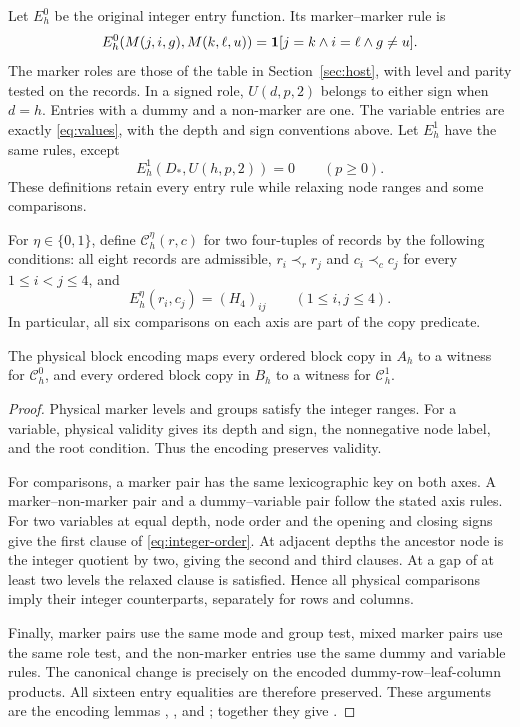 Let $E_h^0$ be the original integer entry function. Its marker--marker
rule is
\[
 E_h^0(M(j,i,g),M(k,\ell,u))=\mathbf1[j=k\land i=\ell\land g\ne u].
\]
The marker roles are those of the table in Section~\ref{sec:host}, with
level and parity tested on the records. In a signed role, $U(d,p,2)$
belongs to either sign when $d=h$. Entries with a dummy and a non-marker
are one. The variable entries are exactly \eqref{eq:values}, with the
depth and sign conventions above. Let $E_h^1$ have the same rules, except
\[
 E_h^1(D_*,U(h,p,2))=0\qquad(p\ge0).
\]
These definitions retain every entry rule while relaxing node ranges and
some comparisons.

For $\eta\in\{0,1\}$, define $\mathcal C_h^\eta(r,c)$ for two
four-tuples of records by the following conditions: all eight records are
admissible, $r_i\prec_r r_j$ and $c_i\prec_c c_j$ for every
$1\le i<j\le4$, and
\[
 E_h^\eta(r_i,c_j)=(H_4)_{ij}\qquad(1\le i,j\le4).
\]
In particular, all six comparisons on each axis are part of the copy
predicate.

\begin{lemma}\label{lem:encoding}
The physical block encoding maps every ordered block copy in $A_h$ to
a witness for $\mathcal C_h^0$, and every ordered block copy in $B_h$ to
a witness for $\mathcal C_h^1$.
\end{lemma}
\begin{proof}
Physical marker levels and groups satisfy the integer ranges. For a
variable, physical validity gives its depth and sign, the nonnegative
node label, and the root condition. Thus the encoding preserves validity.

For comparisons, a marker pair has the same lexicographic key on both
axes. A marker--non-marker pair and a dummy--variable pair follow the
stated axis rules. For two variables at equal depth, node order and the
opening and closing signs give the first clause of
\eqref{eq:integer-order}. At adjacent depths the ancestor node is the
integer quotient by two, giving the second and third clauses. At a gap
of at least two levels the relaxed clause is satisfied. Hence all physical
comparisons imply their integer counterparts, separately for rows and
columns.

Finally, marker pairs use the same mode and group test, mixed marker
pairs use the same role test, and the non-marker entries use the same
dummy and variable rules. The canonical change is precisely on the
encoded dummy-row--leaf-column products. All sixteen entry equalities
are therefore preserved. These arguments are the encoding lemmas
, ,
 and ; together
they give .
\end{proof}


